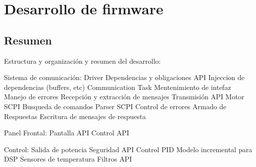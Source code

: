 \chapter[Desarrollo de firmware]{Desarrollo de firmware}
\label{cp:desarrolloFirmware}
\section{Resumen}
Estructura y organización y resumen del desarrollo:

Sistema de comunicación:
    Driver
        Dependencias y obligaciones
        API
        Injeccion de dependencias (buffers, etc)
    Communication Task
        Mentenimiento de intefaz
            Manejo de errores
        Recepción y extracción de mensajes
        Transmisión
        API
    Motor SCPI
        Busqueda de comandos
        Parser SCPI
        Control de errores
        Armado de Respuestas
        Escritura de mensajes de respuesta

Panel Frontal:
    Pantalla
        API
    Control
        API

Control:
    Salida de potencia
        Seguridad
        API
    Control PID
        Modelo incremental para DSP
    Sensores de temperatura
        Filtros
        API

\newpage